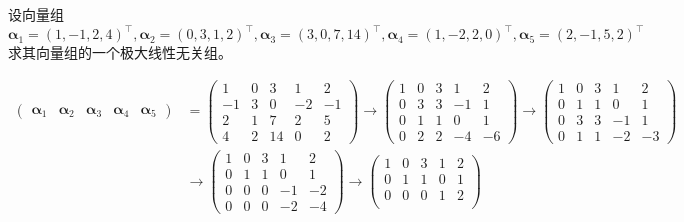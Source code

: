 \begin{example}
    设向量组$\bm{\alpha}_1 = (1,-1,2,4)^\intercal, \bm{\alpha}_2 = (0,3,1,2)^\intercal, \bm{\alpha}_3 = (3,0,7,14)^\intercal, \bm{\alpha}_4 = (1,-2,2,0)^\intercal,\bm{\alpha}_5 = (2,-1,5,2)^\intercal$
    求其向量组的一个极大线性无关组。
\end{example}
\begin{solution}
    \begin{align*}
        \begin{pmatrix}
            \bm{\alpha}_1 & \bm{\alpha}_2 & \bm{\alpha}_3 & \bm{\alpha}_4 & \bm{\alpha}_5
        \end{pmatrix}
         & =
        \begin{pmatrix}
            1  & 0 & 3  & 1  & 2  \\
            -1 & 3 & 0  & -2 & -1 \\
            2  & 1 & 7  & 2  & 5  \\
            4  & 2 & 14 & 0  & 2
        \end{pmatrix}
        \longrightarrow
        \begin{pmatrix}
            1 & 0 & 3 & 1  & 2  \\
            0 & 3 & 3 & -1 & 1  \\
            0 & 1 & 1 & 0  & 1  \\
            0 & 2 & 2 & -4 & -6
        \end{pmatrix}
        \longrightarrow
        \begin{pmatrix}
            1 & 0 & 3 & 1  & 2  \\
            0 & 1 & 1 & 0  & 1  \\
            0 & 3 & 3 & -1 & 1  \\
            0 & 1 & 1 & -2 & -3
        \end{pmatrix} \\
         & \longrightarrow
        \begin{pmatrix}
            1 & 0 & 3 & 1  & 2  \\
            0 & 1 & 1 & 0  & 1  \\
            0 & 0 & 0 & -1 & -2 \\
            0 & 0 & 0 & -2 & -4
        \end{pmatrix}
        \longrightarrow
        \begin{pmatrix}
            1 & 0 & 3 & 1 & 2 \\
            0 & 1 & 1 & 0 & 1 \\
            0 & 0 & 0 & 1 & 2 \\

\end{pmatrix}
\end{align*}
\end{solution}
